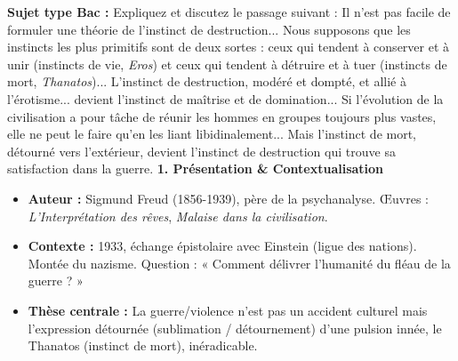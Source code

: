 \documentclass[11pt]{article}
\newcommand{\cle}[1]{{\popxbold\color{popdark}#1}}
\begin{document}
\begin{exoresolu}
\textbf{Sujet type Bac :} \guillemotleft Expliquez et discutez le passage suivant : \guillemotright
\guillemotleft Il n'est pas facile de formuler une théorie de l'instinct de destruction... Nous supposons que les instincts les plus primitifs sont de deux sortes : ceux qui tendent à conserver et à unir (instincts de vie, \emph{Eros}) et ceux qui tendent à détruire et à tuer (instincts de mort, \emph{Thanatos})... L'instinct de destruction, modéré et dompté, et allié à l'érotisme... devient l'instinct de maîtrise et de domination... Si l'évolution de la civilisation a pour tâche de réunir les hommes en groupes toujours plus vastes, elle ne peut le faire qu'en les liant libidinalement... Mais l'instinct de mort, détourné vers l'extérieur, devient l'instinct de destruction qui trouve sa satisfaction dans la guerre. \guillemotright
\tcblower
\textbf{1. Présentation \& Contextualisation}
\begin{itemize}
    \item \textbf{Auteur :} Sigmund Freud (1856-1939), père de la \cle{psychanalyse}. Œuvres : \emph{L'Interprétation des rêves}, \emph{Malaise dans la civilisation}.
    \item \textbf{Contexte :} 1933, échange épistolaire avec Einstein (ligue des nations). Montée du nazisme. Question : « Comment délivrer l'humanité du fléau de la guerre ? »
    \item \textbf{Thèse centrale :} La guerre/violence n'est pas un accident culturel mais l'expression détournée (\cle{sublimation} / \cle{détournement}) d'une pulsion innée, le \cle{Thanatos} (instinct de mort), inéradicable.
\end{itemize}


\end{exoresolu}
\end{document}
